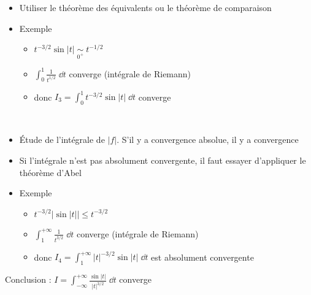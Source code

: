 \begin{frame}

\\

\pause
{}\\
\pause
\vspace*{-1ex}
\begin{itemize}
  \item Utiliser le théorème des équivalents ou le théorème de comparaison
  \pause
  \item Exemple 
  \pause
  \begin{itemize}
    \item $t^{-3/2} \sin |t|  \;\underset{0^+}{\sim}\; t^{-1/2}$
    \pause
    \item $\int_0^1 \frac{1}{t^{1/2}}\;\dd t$ converge (intégrale de Riemann)
    \pause
    \item donc $I_3 = \int_0^1 t^{-3/2} \sin |t| \;\dd t$ converge
  \end{itemize}

\end{itemize}

\pause 

\\
\vspace*{-1ex}
\pause
\begin{itemize}
  \item \'Etude de l'intégrale de $|f|$. S'il y a convergence absolue, il y a convergence
  \pause
  \item Si l'intégrale n'est pas absolument convergente, il
faut essayer d'appliquer le théorème d'Abel
\pause
  \item Exemple 
  \pause
  \begin{itemize}
    \item $t^{-3/2} \big|\sin |t| \big|\le t^{-3/2}$
    \pause
    \item $\int_1^{+\infty} \frac{1}{t^{3/2}}\;\dd t$ converge (intégrale de Riemann)
    \pause
    \item donc $I_4=\int_{1}^{+\infty} |t|^{-3/2} \sin |t| \;\dd t$ est absolument convergente
  \end{itemize} 
\end{itemize}
\pause
Conclusion : $I = \int_{-\infty}^{+\infty} \frac{\sin |t|}{|t|^{3/2}}\;\dd t$ converge
\end{frame}



